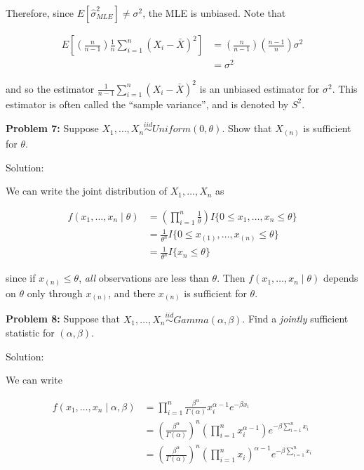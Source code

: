 \documentclass[
  letterpaper,
  DIV=11,
  numbers=noendperiod]{scrreprt}
\begin{document}
Therefore, since \(E[\hat{\sigma}^2_{MLE}] \neq \sigma^2\), the MLE is
unbiased. Note that

\begin{align*}
    E\left[ \left( \frac{n}{n-1} \right)\frac{1}{n} \sum_{i = 1}^n (X_i - \bar{X})^2\right] & = \left( \frac{n}{n-1} \right) \left( \frac{n-1}{n} \right) \sigma^2   \\
    & = \sigma^2
\end{align*}

and so the estimator \(\frac{1}{n-1} \sum_{i = 1}^n (X_i - \bar{X})^2\)
is an unbiased estimator for \(\sigma^2\). This estimator is often
called the ``sample variance'', and is denoted by \(S^2\).

\textbf{Problem 7:} Suppose
\(X_1, \dots, X_n \overset{iid}{\sim} Uniform(0, \theta)\). Show that
\(X_{(n)}\) is sufficient for \(\theta\).

Solution:

We can write the joint distribution of \(X_1, \dots, X_n\) as

\begin{align*}
    f(x_1, \dots, x_n \mid \theta) & = \left( \prod_{i = 1}^n \frac{1}{\theta} \right) I \{0 \leq x_1, \dots, x_n \leq \theta \} \\
    & = \frac{1}{\theta^n} I \{0 \leq x_{(1)}, \dots, x_{(n)} \leq \theta \} \\
    & = \frac{1}{\theta^n} I \{ x_{n} \leq \theta \} 
\end{align*}

since if \(x_{(n)} \leq \theta\), \emph{all} observations are less than
\(\theta\). Then \(f(x_1, \dots, x_n \mid \theta)\) depends on
\(\theta\) only through \(x_{(n)}\), and there \(x_{(n)}\) is sufficient
for \(\theta\).

\textbf{Problem 8:} Suppose that
\(X_1, \dots, X_n \overset{iid}{\sim} Gamma(\alpha, \beta)\). Find a
\emph{jointly} sufficient statistic for \((\alpha, \beta)\).

Solution:

We can write

\begin{align*}
    f(x_1, \dots, x_n \mid \alpha, \beta) & = \prod_{i = 1}^n \frac{\beta^\alpha}{\Gamma(\alpha)} x_i^{\alpha - 1} e^{-\beta x_i} \\
    & = \left( \frac{\beta^\alpha}{\Gamma(\alpha)} \right)^n \left( \prod_{i = 1}^n x_i^{\alpha - 1} \right) e^{-\beta \sum_{i = 1}^n x_i} \\
    & = \left( \frac{\beta^\alpha}{\Gamma(\alpha)} \right)^n \left( \prod_{i = 1}^n x_i \right)^{\alpha - 1}  e^{-\beta \sum_{i = 1}^n x_i}
\end{align*}
\end{document}
